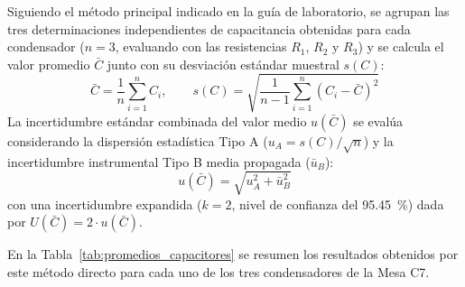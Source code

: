 Siguiendo el método principal indicado en la guía de laboratorio, se agrupan las tres determinaciones independientes de capacitancia obtenidas para cada condensador ($n = 3$, evaluando con las resistencias $R_1$, $R_2$ y $R_3$) y se calcula el valor promedio $\bar{C}$ junto con su desviación estándar muestral $s(C)$:
\begin{equation}
    \bar{C} = \frac{1}{n} \sum_{i=1}^n C_i, \qquad s(C) = \sqrt{\frac{1}{n-1} \sum_{i=1}^n (C_i - \bar{C})^2}
    \label{eq:promedio_c}
\end{equation}
La incertidumbre estándar combinada del valor medio $u(\bar{C})$ se evalúa considerando la dispersión estadística Tipo A ($u_A = s(C) / \sqrt{n}$) y la incertidumbre instrumental Tipo B media propagada ($\bar{u}_B$):
\begin{equation}
    u(\bar{C}) = \sqrt{u_A^2 + \bar{u}_B^2}
\end{equation}
con una incertidumbre expandida ($k=2$, nivel de confianza del \qty{95,45}{\percent}) dada por $U(\bar{C}) = 2 \cdot u(\bar{C})$.

En la Tabla~\ref{tab:promedios_capacitores} se resumen los resultados obtenidos por este método directo para cada uno de los tres condensadores de la Mesa C7.

\begin{table}[H]
    \centering
    \caption{Capacitancia promedio, desviación estándar muestral e incertidumbre combinada por condensador.}
    \label{tab:promedios_capacitores}
\end{table}

